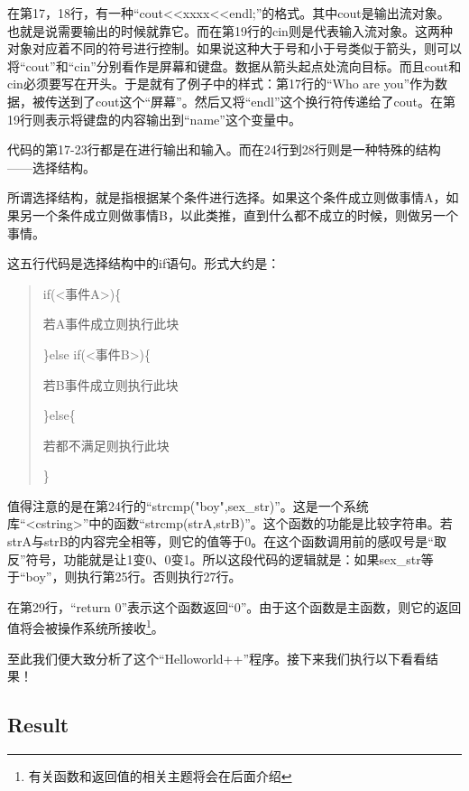 在第17，18行，有一种“cout<<xxxx<<endl;”的格式。其中cout是输出流对象。也就是说需要输出的时候就靠它。而在第19行的cin则是代表输入流对象。这两种对象对应着不同的符号进行控制。如果说这种大于号和小于号类似于箭头，则可以将“cout”和“cin”分别看作是屏幕和键盘。数据从箭头起点处流向目标。而且cout和cin必须要写在开头。于是就有了例子中的样式：第17行的“Who are you”作为数据，被传送到了cout这个“屏幕”。然后又将“endl”这个换行符传递给了cout。在第19行则表示将键盘的内容输出到“name”这个变量中。

代码的第17-23行都是在进行输出和输入。而在24行到28行则是一种特殊的结构——选择结构。

所谓选择结构，就是指根据某个条件进行选择。如果这个条件成立则做事情A，如果另一个条件成立则做事情B，以此类推，直到什么都不成立的时候，则做另一个事情。

这五行代码是选择结构中的if语句。形式大约是：
\begin{quote}
if(<事件A>)\{

	\qquad 若A事件成立则执行此块
	
\}else if(<事件B>)\{

	\qquad 若B事件成立则执行此块
	
\}else\{

	\qquad 若都不满足则执行此块
	
\}
\end{quote}

值得注意的是在第24行的“strcmp("boy",sex\_str)”。这是一个系统库“<cstring>”中的函数“strcmp(strA,strB)”。这个函数的功能是比较字符串。若strA与strB的内容完全相等，则它的值等于0。在这个函数调用前的感叹号是“取反”符号，功能就是让1变0、0变1。所以这段代码的逻辑就是：如果sex\_str等于“boy”，则执行第25行。否则执行27行。

在第29行，“return 0”表示这个函数返回“0”。由于这个函数是主函数，则它的返回值将会被操作系统所接收\footnote{有关函数和返回值的相关主题将会在后面介绍}。

至此我们便大致分析了这个“Helloworld++”程序。接下来我们执行以下看看结果！

\subsection{Result}


